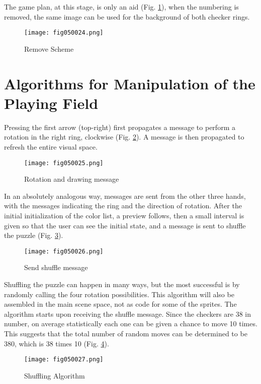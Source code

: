 The game plan, at this stage, is only an aid (Fig. \ref{fig050024}), when the numbering is removed, the same image can be used for the background of both checker rings.

\begin{figure}[H]
   \centering
   \texttt{[image: fig050024.png]}
   \caption{Remove Scheme}
\label{fig050024}
\end{figure}

\section{Algorithms for Manipulation of the Playing Field}

Pressing the first arrow (top-right) first propagates a message to perform a rotation in the right ring, clockwise (Fig. \ref{fig050025}). A message is then propagated to refresh the entire visual space.

\begin{figure}[H]
   \centering
   \texttt{[image: fig050025.png]}
   \caption{Rotation and drawing message}
\label{fig050025}
\end{figure}

In an absolutely analogous way, messages are sent from the other three hands, with the messages indicating the ring and the direction of rotation. After the initial initialization of the color list, a preview follows, then a small interval is given so that the user can see the initial state, and a message is sent to shuffle the puzzle (Fig. \ref{fig050026}).

\begin{figure}[H]
   \centering
   \texttt{[image: fig050026.png]}
   \caption{Send shuffle message}
\label{fig050026}
\end{figure}

Shuffling the puzzle can happen in many ways, but the most successful is by randomly calling the four rotation possibilities. This algorithm will also be assembled in the main scene space, not as code for some of the sprites. The algorithm starts upon receiving the shuffle message. Since the checkers are 38 in number, on average statistically each one can be given a chance to move 10 times. This suggests that the total number of random moves can be determined to be 380, which is 38 times 10 (Fig. \ref{fig050027}).

\begin{figure}[H]
   \centering
   \texttt{[image: fig050027.png]}
   \caption{Shuffling Algorithm}
\label{fig050027}
\end{figure}


